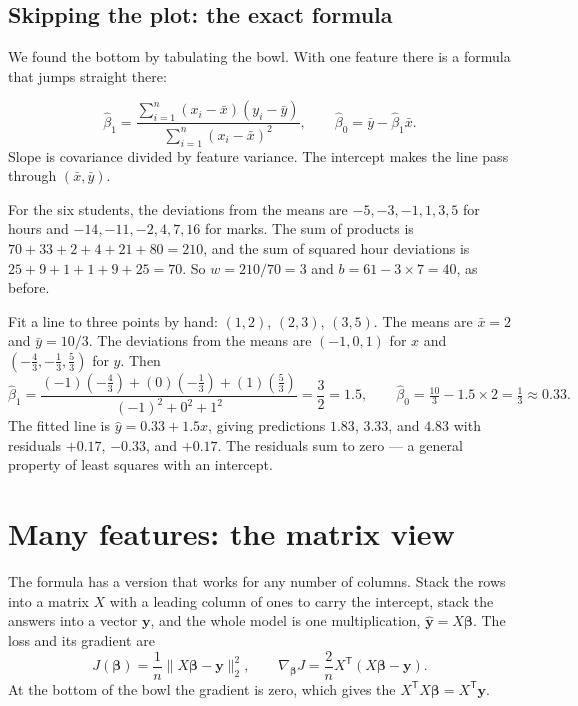 \subsection{Skipping the plot: the exact formula}

We found the bottom by tabulating the bowl. With one feature there is a formula that jumps straight there:

\[
  \hat{\beta}_1
  =\frac{\sum_{i=1}^{n}(x_i-\bar{x})(y_i-\bar{y})}
        {\sum_{i=1}^{n}{(x_i-\bar{x})}^2},
  \qquad
  \hat{\beta}_0=\bar{y}-\hat{\beta}_1\bar{x}.
\]
Slope is covariance divided by feature variance. The intercept makes the line pass through $(\bar x,\bar y)$.

\begin{workedexample}
For the six students, the deviations from the means are $-5,-3,-1,1,3,5$ for hours and $-14,-11,-2,4,7,16$ for marks. The sum of products is $70+33+2+4+21+80=210$, and the sum of squared hour deviations is $25+9+1+1+9+25=70$. So $w=210/70=3$ and $b=61-3\times7=40$, as before.
\end{workedexample}

\begin{workedexample}
Fit a line to three points by hand: $(1,2)$, $(2,3)$, $(3,5)$.
The means are $\bar{x}=2$ and $\bar{y}=10/3$. The deviations from the means are $(-1,0,1)$ for $x$ and $(-\tfrac{4}{3},-\tfrac{1}{3},\tfrac{5}{3})$ for $y$. Then
\[
  \hat{\beta}_1
  =\frac{(-1)(-\tfrac{4}{3})+(0)(-\tfrac{1}{3})+(1)(\tfrac{5}{3})}
        {{(-1)}^2+0^2+1^2}
  =\frac{3}{2}=1.5,
  \qquad
  \hat{\beta}_0=\tfrac{10}{3}-1.5\times 2=\tfrac{1}{3}\approx 0.33.
\]
The fitted line is $\hat{y}=0.33+1.5x$, giving predictions $1.83$, $3.33$, and $4.83$ with residuals $+0.17$, $-0.33$, and $+0.17$. The residuals sum to zero --- a general property of least squares with an intercept.
\end{workedexample}

\section{Many features: the matrix view}

The formula has a version that works for any number of columns. Stack the rows into a matrix $X$ with a leading column of ones to carry the intercept, stack the answers into a vector $\bm{y}$, and the whole model is one multiplication, $\hat{\bm{y}}=X\bm{\beta}$. The loss and its gradient are
\[
  J(\bm{\beta})=\frac{1}{n}\|X\bm{\beta}-\bm{y}\|_2^2,
  \qquad
  \nabla_{\bm{\beta}}J
  =\frac{2}{n}X^{\mathsf T}(X\bm{\beta}-\bm{y}).
\]
At the bottom of the bowl the gradient is zero, which gives the  $X^{\mathsf T}X\bm{\beta}=X^{\mathsf T}\bm{y}$.

